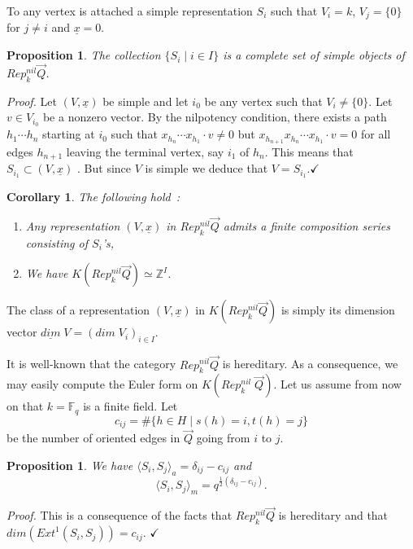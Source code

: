 \documentclass[a4paper,10pt]{amsart}
\def\Z{\mathbb{Z}}
\def\qed{$\hfill \checkmark$}
\newtheorem{cor}[theo]{Corollary}
\newtheorem{prop}[theo]{Proposition}
\numberwithin{equation}{section}
\begin{document}
\vspace{.1in}

To any vertex is attached a simple representation $S_i$ such that $V_i =k$, $V_j=\{0\}$ for $j\neq i$ and $\underline{x}=0$.

\vspace{.1in}

\begin{prop} The collection $\{S_i\;|\; i \in I\}$ is a complete set of simple objects of $Rep^{nil}_k\vec{Q}$. \end{prop}
\noindent
\textit{Proof.} Let $(V,\underline{x})$ be simple and let $i_0$ be any vertex such that $V_i \neq \{0\}$.
Let $v \in V_{i_0}$ be a nonzero vector. By the nilpotency condition, there exists a path $h_1 \cdots h_n$ starting at $i_0$ such that $x_{h_n} \cdots x_{h_1} \cdot v \neq 0$ but $x_{h_{n+1}}x_{h_n} \cdots x_{h_1} \cdot v = 0$ for all edges $h_{n+1}$ leaving the terminal vertex, say $i_1$ of $h_n$. This means that $S_{i_1} \subset (V,\underline{x})$ . But since $V$ is simple we deduce that $V=S_{i_1}$.\qed

\vspace{.1in}

\begin{cor} The following hold~:
\begin{enumerate}
\item[i)] Any representation $(V,\underline{x})$ in $Rep^{nil}_k\vec{Q}$ admits a finite composition series consisting of $S_i$'s,
\item[ii)] We have $K(Rep^{nil}_k\vec{Q}) \simeq \Z^I$.
\end{enumerate}
\end{cor}

\vspace{.1in}

The class of a representation $(V,\underline{x})$ in $K(Rep^{nil}_k\vec{Q})$ is simply its dimension vector $\underline{{dim}}\; V=({dim}\;V_i)_{i \in I}$.

\vspace{.1in}

It is well-known that the category $Rep^{nil}_k\vec{Q}$ is hereditary.
As a consequence, we may easily compute the Euler form on $K(Rep^{nil}_k\;\vec{Q})$. Let us assume from now on that $k=\mathbb{F}_q$ is a finite field. Let
$$c_{ij}=\#\{h\in H\;|\; s(h)=i, t(h)=j\}$$
be the number of oriented edges in $\vec{Q}$ going from $i$ to $j$.

\begin{prop} We have $\langle S_i, S_j \rangle_a=\delta_{ij}-c_{ij}$ and
$$\langle S_i,S_j \rangle_m=q^{\frac{1}{2}(\delta_{ij}-c_{ij})}.$$
\end{prop}
\noindent
\textit{Proof.} This is a consequence of the facts that $Rep^{nil}_k\vec{Q}$ is hereditary and that
${dim}( {Ext}^1(S_i,S_j))=c_{ij}$. \qed
\end{document}
